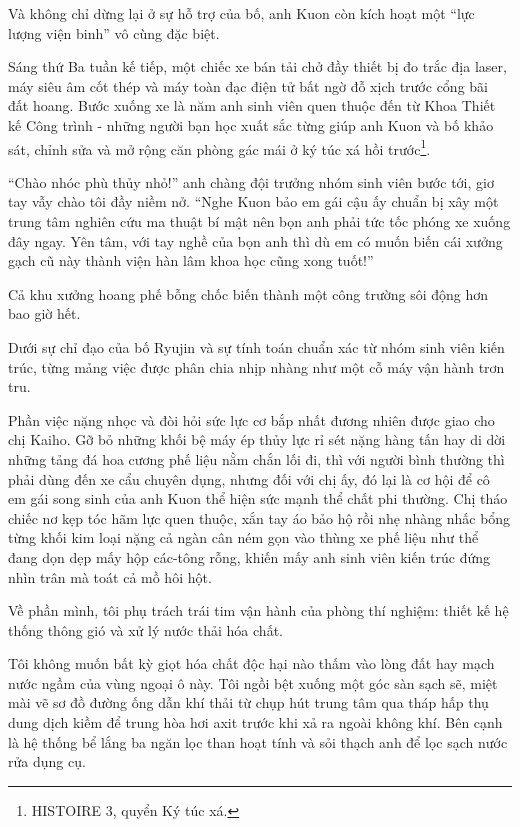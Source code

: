 \documentclass[../main.tex]{subfiles}
\begin{document}
Và không chỉ dừng lại ở sự hỗ trợ của bố, anh Kuon còn kích hoạt một ``lực lượng viện binh'' vô cùng đặc biệt.

Sáng thứ Ba tuần kế tiếp, một chiếc xe bán tải chở đầy thiết bị đo trắc địa laser, máy siêu âm cốt thép và máy toàn đạc điện tử bất ngờ đỗ xịch trước cổng bãi đất hoang. Bước xuống xe là năm anh sinh viên quen thuộc đến từ Khoa Thiết kế Công trình - những người bạn học xuất sắc từng giúp anh Kuon và bố khảo sát, chỉnh sửa và mở rộng căn phòng gác mái ở ký túc xá hồi trước\footnote{{\flaregothic HISTOIRE 3}, quyển Ký túc xá.}.

``Chào nhóc phù thủy nhỏ!'' anh chàng đội trưởng nhóm sinh viên bước tới, giơ tay vẫy chào tôi đầy niềm nở. ``Nghe Kuon bảo em gái cậu ấy chuẩn bị xây một trung tâm nghiên cứu ma thuật bí mật nên bọn anh phải tức tốc phóng xe xuống đây ngay. Yên tâm, với tay nghề của bọn anh thì dù em có muốn biến cái xưởng gạch cũ này thành viện hàn lâm khoa học cũng xong tuốt!''

Cả khu xưởng hoang phế bỗng chốc biến thành một công trường sôi động hơn bao giờ hết.

Dưới sự chỉ đạo của bố Ryujin và sự tính toán chuẩn xác từ nhóm sinh viên kiến trúc, từng mảng việc được phân chia nhịp nhàng như một cỗ máy vận hành trơn tru.

Phần việc nặng nhọc và đòi hỏi sức lực cơ bắp nhất đương nhiên được giao cho chị Kaiho. Gỡ bỏ những khối bệ máy ép thủy lực rỉ sét nặng hàng tấn hay di dời những tảng đá hoa cương phế liệu nằm chắn lối đi, thì với người bình thường thì phải dùng đến xe cẩu chuyên dụng, nhưng đối với chị ấy, đó lại là cơ hội để cô em gái song sinh của anh Kuon thể hiện sức mạnh thể chất phi thường. Chị tháo chiếc nơ kẹp tóc hãm lực quen thuộc, xắn tay áo bảo hộ rồi nhẹ nhàng nhấc bổng từng khối kim loại nặng cả ngàn cân ném gọn vào thùng xe phế liệu như thể đang dọn dẹp mấy hộp các-tông rỗng, khiến mấy anh sinh viên kiến trúc đứng nhìn trân mà toát cả mồ hôi hột.

Về phần mình, tôi phụ trách trái tim vận hành của phòng thí nghiệm: thiết kế hệ thống thông gió và xử lý nước thải hóa chất.

Tôi không muốn bất kỳ giọt hóa chất độc hại nào thấm vào lòng đất hay mạch nước ngầm của vùng ngoại ô này. Tôi ngồi bệt xuống một góc sàn sạch sẽ, miệt mài vẽ sơ đồ đường ống dẫn khí thải từ chụp hút trung tâm qua tháp hấp thụ dung dịch kiềm để trung hòa hơi axit trước khi xả ra ngoài không khí. Bên cạnh là hệ thống bể lắng ba ngăn lọc than hoạt tính và sỏi thạch anh để lọc sạch nước rửa dụng cụ.
\end{document}
